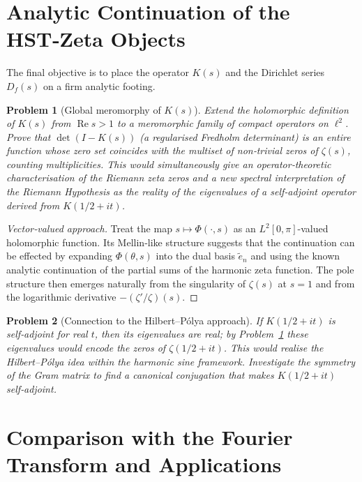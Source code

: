 \documentclass[11pt,a4paper]{article}
\newtheorem{problem}{Problem}[section]
\begin{document}
\section{Analytic Continuation of the HST‑Zeta Objects}

The final objective is to place the operator \(K(s)\) and the Dirichlet series \(D_f(s)\) on a firm analytic footing.

\begin{problem}[Global meromorphy of \(K(s)\)]
\label{prob:global}
Extend the holomorphic definition of \(K(s)\) from \(\operatorname{Re} s>1\) to a meromorphic family of compact operators on \(\ell^2\). Prove that \(\det(I - K(s))\) (a regularised Fredholm determinant) is an entire function whose zero set coincides with the multiset of non‑trivial zeros of \(\zeta(s)\), counting multiplicities. This would simultaneously give an operator‑theoretic characterisation of the Riemann zeta zeros and a new spectral interpretation of the Riemann Hypothesis as the reality of the eigenvalues of a self‑adjoint operator derived from \(K(1/2+it)\).
\end{problem}

\begin{proof}[Vector‑valued approach]
Treat the map \(s\mapsto \Phi(\cdot,s)\) as an \(L^2[0,\pi]\)-valued holomorphic function. Its Mellin‑like structure suggests that the continuation can be effected by expanding \(\Phi(\theta,s)\) into the dual basis \(\tilde{e}_n\) and using the known analytic continuation of the partial sums of the harmonic zeta function. The pole structure then emerges naturally from the singularity of \(\zeta(s)\) at \(s=1\) and from the logarithmic derivative \(-(\zeta'/\zeta)(s)\).
\end{proof}

\begin{problem}[Connection to the Hilbert–Pólya approach]
\label{prob:hp}
If \(K(1/2+it)\) is self‑adjoint for real \(t\), then its eigenvalues are real; by Problem~\ref{prob:global} these eigenvalues would encode the zeros of \(\zeta(1/2+it)\). This would realise the Hilbert–Pólya idea within the harmonic sine framework. Investigate the symmetry of the Gram matrix to find a canonical conjugation that makes \(K(1/2+it)\) self‑adjoint.
\end{problem}

\section{Comparison with the Fourier Transform and Applications}
\end{document}
